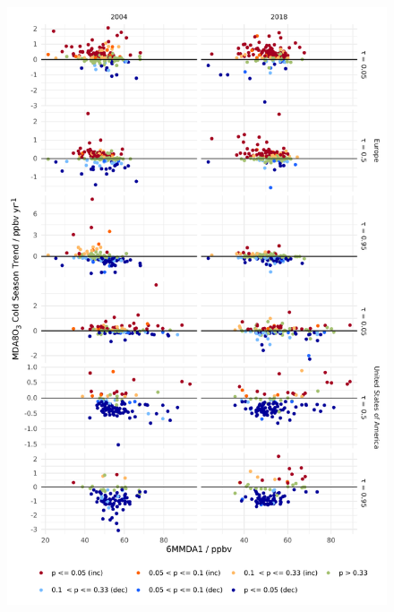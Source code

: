 \documentclass{article}
\begin{document}
\begin{figure}[p]
\centering
\includegraphics[height=0.75\textheight]{figures/si_figures/fS23_mda8_cold_sig_mda8_6mmda1.pdf}
\caption{}
\label{si_fig:mda8_cold_sig_mda8_6mmda1}
\end{figure}
\clearpage


\end{document}
